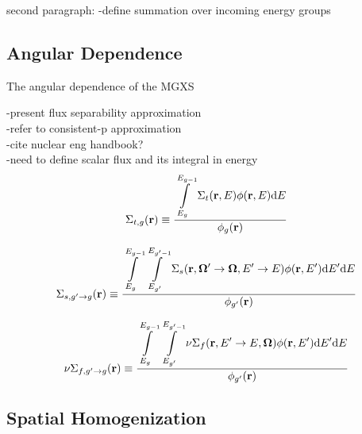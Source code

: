 second paragraph:
-define summation over incoming energy groups


\subsection{Angular Dependence}
\label{sec:chap2-angle}

The angular dependence of the \ac{MGXS} 

-present flux separability approximation \\
-refer to consistent-p approximation \\
-cite nuclear eng handbook?\\
-need to define scalar flux and its integral in energy \\

\begin{dmath}
\label{eqn:chap1-sigt-mg-scalar}
\Sigma_{t,g}(\mathbf{r}) \equiv \ddfrac{\int\displaylimits_{E_{g}}^{E_{g-1}} \Sigma_{t}(\mathbf{r},E)\phi(\mathbf{r},E)\mathrm{d}E}{\phi_{g}(\mathbf{r})}
\end{dmath}

\begin{dmath}
\label{eqn:chap1-sigs-mg-scalar}
\Sigma_{s,g' \rightarrow g}(\mathbf{r}) \equiv \ddfrac{\int\displaylimits_{E_{g}}^{E_{g-1}} \int\displaylimits_{E_{g'}}^{E_{g'-1}} \Sigma_{s}(\mathbf{r},{\mathbf{\Omega'}\rightarrow\mathbf{\Omega}},{E'\rightarrow E}) \phi(\mathbf{r},E') \mathrm{d}E' \mathrm{d}E} {\phi_{g'}(\mathbf{r})}
\end{dmath}

\begin{dmath}
\label{eqn:chap1-nusigf-mg-scalar}
\nu\Sigma_{f,g' \rightarrow g}(\mathbf{r}) \equiv \ddfrac{\int\displaylimits_{E_{g}}^{E_{g-1}} \int\displaylimits_{E_{g'}}^{E_{g'-1}} \nu\Sigma_{f}(\mathbf{r},{E'\rightarrow E},\mathbf{\Omega})\phi(\mathbf{r},E') \mathrm{d}E'\mathrm{d}E}{\phi_{g'}(\mathbf{r})}
\end{dmath}



\subsection{Spatial Homogenization}
\label{sec:chap2-space}


